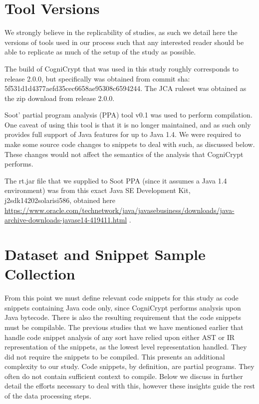 \documentclass[10pt, conference]{IEEEtran}
\begin{document}
\section{Tool Versions}

We strongly believe in the replicability of studies, as such we detail here the versions of tools used in our process such that any interested reader should be able to replicate as much of the setup of the study as possible.

The build of CogniCrypt that was used in this study roughly corresponds to release 2.0.0, but specifically was obtained from commit sha: 5f531d1d4377aefd35cec6658ae95308c6594244. The JCA ruleset was obtained as the zip download from release 2.0.0. 

Soot' partial program analysis (PPA) tool v0.1 \cite{SootPPA} was used to perform compilation. One caveat of using this tool is that it is no longer maintained, and as such only provides full support of Java features for up to Java 1.4. We were required to make some source code changes to snippets to deal with such, as discussed below. These changes would not affect the semantics of the analysis that CogniCrypt performs.

The rt.jar file that we supplied to Soot PPA (since it assumes a Java 1.4 environment) was from this exact Java SE Development Kit, j2sdk14202solarisi586, 
obtained here 
\url{https://www.oracle.com/technetwork/java/javasebusiness/downloads/java-archive-downloads-javase14-419411.html} .

\section{Dataset and Snippet Sample Collection}


From this point we must define relevant code snippets for this study as code snippets containing Java code only, since CogniCrypt performs analysis upon Java bytecode. There is also the resulting requirement that the code snippets must be compilable. The previous studies that we have mentioned earlier that handle code snippet analysis of any sort have relied upon either AST or IR representation of the snippets, as the lowest level representation handled. They did not require the snippets to be compiled. This presents an additional complexity to our study. Code snippets, by definition, are partial programs. They often do not contain sufficient context to compile. Below we discuss in further detail the efforts necessary to deal with this, however these insights guide the rest of the data processing steps.
\end{document}
